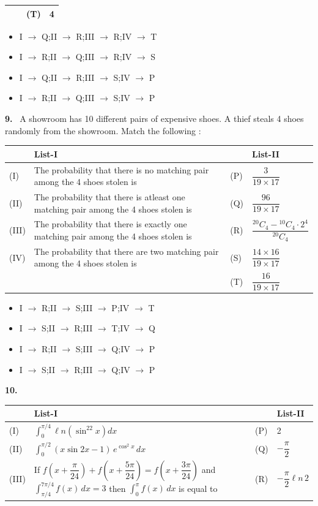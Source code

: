 \documentclass[10pt]{extarticle}
\newcommand{\qn}[1]{\par\smallskip\noindent\textbf{#1.}~}
\newenvironment{qoptions}{\begin{itemize}[leftmargin=1.8em,itemsep=1pt,topsep=2pt,label={}]}{\end{itemize}}
\newcommand{\opt}[2]{\item[(#1)] #2}
\begin{document}
\begin{multicols}{2}
\begin{center}
\begin{tabular}{|L{0.6cm}L{4.8cm}|L{0.6cm}L{0.7cm}|}
&&(T)&4\\\hline
\end{tabular}\end{center}
\begin{qoptions}
\opt{A}{I $\to$ Q;II $\to$ R;III $\to$ R;IV $\to$ T}
\opt{B}{I $\to$ R;II $\to$ Q;III $\to$ R;IV $\to$ S}
\opt{C}{I $\to$ Q;II $\to$ R;III $\to$ S;IV $\to$ P}
\opt{D}{I $\to$ R;II $\to$ Q;III $\to$ S;IV $\to$ P}
\end{qoptions}
\qn{9} A showroom has 10 different pairs of expensive shoes. A thief steals 4 shoes randomly from the showroom. Match the following :
\begin{center}\footnotesize\setlength{\tabcolsep}{1pt}
\begin{tabular}{|L{0.6cm}L{3.4cm}|L{0.6cm}L{2.4cm}|}\hline
&List-I&&List-II\\\hline
(I)&The probability that there is no matching pair among the 4 shoes stolen is&(P)&$\dfrac3{19\times17}$\\\hline
(II)&The probability that there is atleast one matching pair among the 4 shoes stolen is&(Q)&$\dfrac{96}{19\times17}$\\\hline
(III)&The probability that there is exactly one matching pair among the 4 shoes stolen is&(R)&$\dfrac{{}^{20}C_4-{}^{10}C_4\cdot2^4}{{}^{20}C_4}$\\\hline
(IV)&The probability that there are two matching pair among the 4 shoes stolen is&(S)&$\dfrac{14\times16}{19\times17}$\\\hline
&&(T)&$\dfrac{16}{19\times17}$\\\hline
\end{tabular}\end{center}
\begin{qoptions}
\opt{A}{I $\to$ R;II $\to$ S;III $\to$ P;IV $\to$ T}
\opt{B}{I $\to$ S;II $\to$ R;III $\to$ T;IV $\to$ Q}
\opt{C}{I $\to$ R;II $\to$ S;III $\to$ Q;IV $\to$ P}
\opt{D}{I $\to$ S;II $\to$ R;III $\to$ Q;IV $\to$ P}
\end{qoptions}
\qn{10} \begin{center}\footnotesize\setlength{\tabcolsep}{1pt}
\begin{tabular}{|L{0.6cm}L{4.6cm}|L{0.6cm}L{1.0cm}|}\hline
&List-I&&List-II\\\hline
(I)&$\displaystyle\int_0^{\pi/4}\ell n\left(\sin^22x\right)dx$&(P)&2\\\hline
(II)&$\displaystyle\int_0^{\pi/2}(x\sin2x-1)\,e^{\cos^2x}\,dx$&(Q)&$-\dfrac\pi2$\\\hline
(III)&If $f\!\left(x+\dfrac\pi{24}\right)+f\!\left(x+\dfrac{5\pi}{24}\right)=f\!\left(x+\dfrac{3\pi}{24}\right)$ and $\displaystyle\int_{\pi/4}^{7\pi/4}f(x)\,dx=3$ then $\displaystyle\int_0^\pi f(x)\,dx$ is equal to&(R)&$-\dfrac\pi2\ell n\,2$\\\hline

\end{tabular}
\end{center}
\end{multicols}
\end{document}
